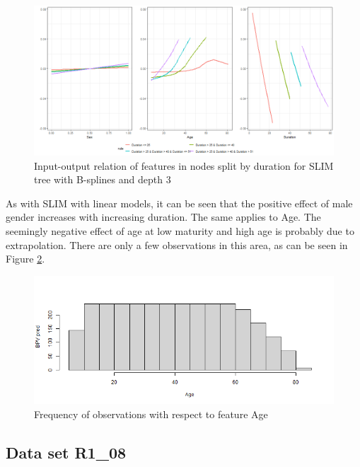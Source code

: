 \begin{figure}[!htb]
    \centering
    \includegraphics[width = 16cm]{Figures/insurance_use_case/k2204_BPV/effects_duration.png}
    \caption{Input-output relation of features in nodes split by duration for SLIM tree with B-splines and depth 3}
    \label{fig:ins_k2204_effects_duration}
\end{figure}

As with SLIM with linear models, it can be seen that the positive effect of male gender increases with increasing duration. The same applies to Age. The seemingly negative effect of age at low maturity and high age is probably due to extrapolation. There are only a few observations in this area, as can be seen in Figure \ref{fig:ins_k2204_hist_age}.

\begin{figure}[!htb]
    \centering
    \includegraphics[width = 14cm]{Figures/insurance_use_case/k2204_BPV/hist_age.png}
    \caption{Frequency of observations with respect to feature Age}
    \label{fig:ins_k2204_hist_age}
\end{figure}


\subsection{Data set R1\_08}



